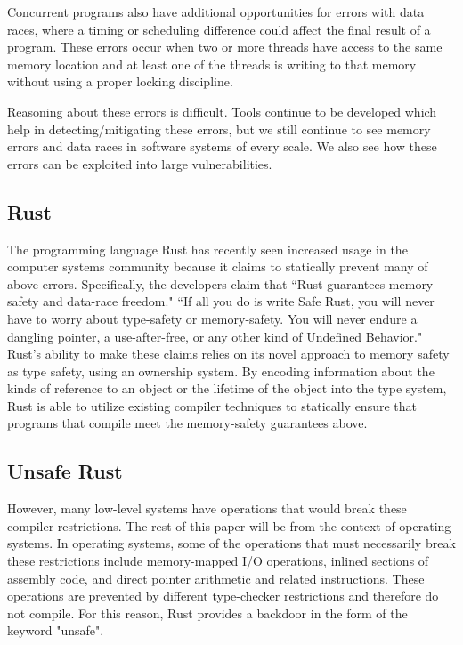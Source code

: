 \documentclass[12pt]{article}
\begin{document}
Concurrent programs also have additional opportunities for errors with data races, where a timing or scheduling difference could affect the final result of a program. These errors occur when two or more threads have access to the same memory location and at least one of the threads is writing to that memory without using a proper locking discipline. %

Reasoning about these errors is difficult. Tools continue to be developed which help in detecting/mitigating these errors, but we still continue to see memory errors and data races in software systems of every scale. We also see how these errors can be exploited into large vulnerabilities. %

\subsection{Rust}
The programming language Rust has recently seen increased usage in the computer systems community because it claims to statically prevent many of above errors. Specifically, the developers claim that ``Rust guarantees memory safety and data-race freedom." %
``If all you do is write Safe Rust, you will never have to worry about type-safety or memory-safety. You will never endure a dangling pointer, a use-after-free, or any other kind of Undefined Behavior."
Rust's ability to make these claims relies on its novel approach to memory safety as type safety, using an ownership system. By encoding information about the kinds of reference to an object or the lifetime of the object into the type system, Rust is able to utilize existing compiler techniques to statically ensure that programs that compile meet the memory-safety guarantees above.

\subsection{Unsafe Rust}
However, many low-level systems have operations that would break these compiler restrictions. The rest of this paper will be from the context of operating systems. In operating systems, some of the operations that must necessarily break these restrictions include memory-mapped I/O operations, inlined sections of assembly code, and direct pointer arithmetic and related instructions. These operations are prevented by different type-checker restrictions and therefore do not compile. For this reason, Rust provides a backdoor in the form of the keyword "unsafe".
\end{document}

